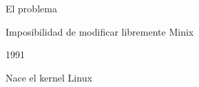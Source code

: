 \documentclass[hyperref={colorlinks}]{beamer}
\begin{document}
\begin{frame}
\begin{minipage}{.55\linewidth}
\begin{block}{El problema}
\begin{itemize}
                    \begin{minipage}{.75\linewidth} Imposibilidad de modificar libremente Minix \end{minipage}
                    \pause
            \end{itemize}
        \end{block}
    \begin{block}{1991}
        \begin{minipage}{.2\linewidth}
        \end{minipage}
        \begin{minipage}{.75\linewidth}
        Nace el kernel Linux
        \end{minipage}
    \end{block}
    \end{minipage}
\end{frame}
\end{document}
